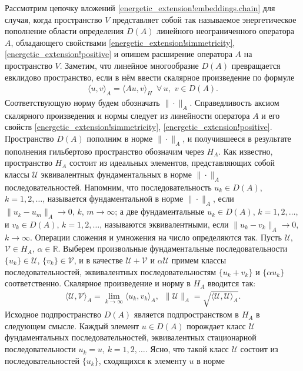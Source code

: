 \documentclass{report}
\begin{document}
Рассмотрим цепочку вложений \eqref{energetic_extension!embeddings.chain} для случая, когда пространство $V$ представляет собой так называемое энергетическое пополнение области определения
$D(A)$ линейного неограниченного оператора $A$, обладающего свойствами \eqref{energetic_extension!simmetricity}, \eqref{energetic_extension!positive} и опишем расширение оператора $A$ на
пространство $V$. Заметим, что линейное многообразие $D(A)$ превращается евклидово пространство, если в нём ввести скалярное произведение по формуле
\begin{gather}\label{energetic_extension!A.norm.in.D(A)}
\langle u,v\rangle_A=\langle Au,v\rangle_H\,\,\,\forall\,u,\,\,v\in D(A).
\end{gather}
Соответствующую норму будем обозначать $\|\cdot\|_A$. Справедливость аксиом скалярного произведения и нормы следует из линейности оператора $A$ и его свойств
\eqref{energetic_extension!simmetricity}, \eqref{energetic_extension!positive}. Пространство $D(A)$ пополним в норме $\|\cdot\|_A$, и получившееся в результате пополнения гильбертово
пространство обозначим через $H_A$. Как известно, пространство $H_A$ состоит из идеальных элементов, представляющих собой классы $\mathcal{U}$ эквивалентных фундаментальных в норме
$\|\cdot\|_A$ последовательностей. Напомним, что последовательность $u_k\in D(A)$, $k=1,2,\dots$, называется фундаментальной в норме $\|\cdot\|_A$, если $\|u_k-u_m\|_A\to0$, $k$,
$m\to\infty$; а две фундаментальные $u_k\in D(A)$, $k=1,2,\dots$, и $v_k\in D(A)$, $k=1,2,\dots$, называются эквивалентными, если $\|u_k-v_k\|_A\to0$, $k\to\infty$.  Операции сложения и
умножения на число определяются так. Пусть $\mathcal{U}$, $\mathcal{V}\in H_A$, $\alpha\in\mathbb{R}$. Выберем произвольные фундаментальные последовательности $\{u_k\}\in\mathcal{U}$,
$\{v_k\}\in\mathcal{V}$, и в качестве $\mathcal{U}+\mathcal{V}$ и $\alpha\mathcal{U}$ примем классы последовательностей, эквивалентных последовательностям $\{u_k+v_k\}$ и $\{\alpha u_k\}$
соответственно. Скалярное произведение и норму в $H_A$ вводится так:
\begin{gather*}
\langle\mathcal{U},\mathcal{V}\rangle_A=\lim\limits_{k\to\infty}\langle u_k,v_k\rangle_A,\,\,\,\|\mathcal{U}\|_A=\sqrt{\langle\mathcal{U},\mathcal{U}\rangle_A}.
\end{gather*}
Исходное подпространство $D(A)$ является подпространством в $H_A$ в следующем смысле. Каждый элемент $u\in D(A)$ порождает класс $\mathcal{U}$ фундаментальных последовательностей,
эквивалентных стационарной последовательности $u_k=u$, $k=1,2,\dots$. Ясно, что такой класс $\mathcal{U}$ состоит из последовательностей $\{u_k\}$, сходящихся к элементу $u$ в норме
\end{document}
